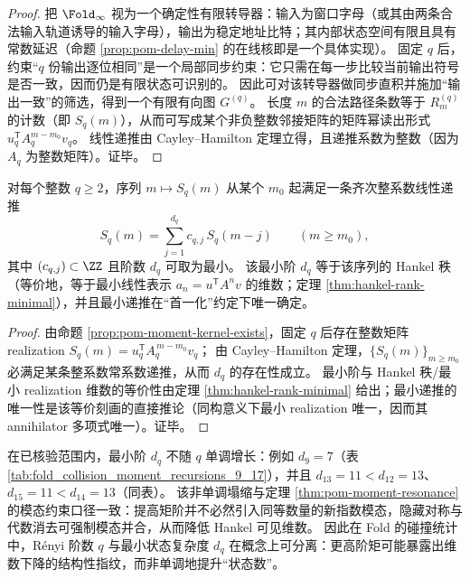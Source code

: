 \begin{proof}
把 \(\Fold_\infty\) 视为一个确定性有限转导器：输入为窗口字母（或其由两条合法输入轨道诱导的输入字母），输出为稳定地址比特；其内部状态空间有限且具有常数延迟（命题 \ref{prop:pom-delay-min} 的在线核即是一个具体实现）。
固定 \(q\) 后，约束“\(q\) 份输出逐位相同”是一个局部同步约束：它只需在每一步比较当前输出符号是否一致，因而仍是有限状态可识别的。
因此可对该转导器做同步直积并施加“输出一致”的筛选，得到一个有限有向图 \(G^{(q)}\)。
长度 \(m\) 的合法路径条数等于 \(R_m^{(q)}\) 的计数（即 \(S_q(m)\)），从而可写成某个非负整数邻接矩阵的矩阵幂读出形式 \(u_q^{\mathsf T}A_q^{m-m_0}v_q\)。
线性递推由 Cayley--Hamilton 定理立得，且递推系数为整数（因为 \(A_q\) 为整数矩阵）。证毕。
\end{proof}

\begin{proposition}\label{prop:pom-moment-minrecurrence-hankel}
对每个整数 \(q\ge 2\)，序列 \(m\mapsto S_q(m)\) 从某个 \(m_0\) 起满足一条齐次整系数线性递推
\[
S_q(m)=\sum_{j=1}^{d_q} c_{q,j}\,S_q(m-j)\qquad(m\ge m_0),
\]
其中 \((c_{q,j})\subset\ZZ\) 且阶数 \(d_q\) 可取为最小。
该最小阶 \(d_q\) 等于该序列的 Hankel 秩（等价地，等于最小线性表示 \(a_n=u^{\mathsf T}A^n v\) 的维数；定理 \ref{thm:hankel-rank-minimal}），并且最小递推在“首一化”约定下唯一确定。
\end{proposition}
\begin{proof}
由命题 \ref{prop:pom-moment-kernel-exists}，固定 \(q\) 后存在整数矩阵 realization \(S_q(m)=u_q^{\mathsf T}A_q^{\,m-m_0}v_q\)；
由 Cayley--Hamilton 定理，\(\{S_q(m)\}_{m\ge m_0}\) 必满足某条整系数常系数递推，从而 \(d_q\) 的存在性成立。
最小阶与 Hankel 秩/最小 realization 维数的等价性由定理 \ref{thm:hankel-rank-minimal} 给出；最小递推的唯一性是该等价刻画的直接推论（同构意义下最小 realization 唯一，因而其 annihilator 多项式唯一）。证毕。
\end{proof}

\begin{remark}\label{rem:pom-moment-order-collapse-nonmonotone}
在已核验范围内，最小阶 \(d_q\) 不随 \(q\) 单调增长：例如 \(d_9=7\)（表 \ref{tab:fold_collision_moment_recursions_9_17}），并且 \(d_{13}=11<d_{12}=13\)、\(d_{15}=11<d_{14}=13\)（同表）。
该非单调塌缩与定理 \ref{thm:pom-moment-resonance} 的模态约束口径一致：提高矩阶并不必然引入同等数量的新指数模态，隐藏对称与代数消去可强制模态并合，从而降低 Hankel 可见维数。
因此在 Fold 的碰撞统计中，Rényi 阶数 \(q\) 与最小状态复杂度 \(d_q\) 在概念上可分离：更高阶矩可能暴露出维数下降的结构性指纹，而非单调地提升“状态数”。
\end{remark}

